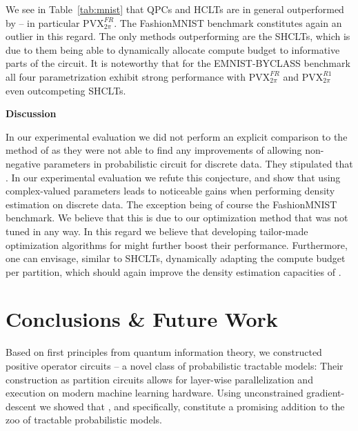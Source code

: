 We see in Table~\ref{tab:mnist} that QPCs and HCLTs are in general outperformed by \pvc -- in particular $\mathrm{PVX}_{2\pi}^{FR}$. The FashionMNIST benchmark constitutes again an outlier in this regard.
The only methods outperforming \pvcs are the SHCLTs, which is due to them being able to dynamically allocate compute budget to informative parts of the circuit.
It is noteworthy that for the EMNIST-BYCLASS benchmark all four  \pvc parametrization exhibit strong performance with  $\mathrm{PVX}_{2\pi}^{FR}$ and $\mathrm{PVX}_{2\pi}^{R1}$ even outcompeting SHCLTs.


\textbf{Discussion}

In our experimental evaluation we did not perform an explicit comparison to the method of \citet{loconte2024subtractive} as they were not able to find any improvements of allowing non-negative parameters in probabilistic circuit for discrete data. They stipulated that
.
In our experimental evaluation we refute this conjecture, and show that using complex-valued parameters leads to noticeable gains when performing density estimation on discrete data.
The exception being of course the FashionMNIST benchmark. We believe that this is due to our optimization method that was not tuned in any way.
In this regard we believe that developing tailor-made optimization algorithms for \pvcs might further boost their performance.
Furthermore, one can envisage, similar to SHCLTs, dynamically adapting the compute budget per partition, which should again improve the density estimation capacities of \pvcs.






\section{Conclusions \& Future Work}
\label{sec:conclusions}

Based on first principles from quantum information theory, we constructed positive operator circuits -- a novel class of probabilistic tractable models:
Their construction as partition circuits allows for layer-wise parallelization and execution on modern machine learning hardware.
Using unconstrained gradient-descent we showed that \pocs, and \pvcs specifically, constitute a promising addition to the zoo of tractable probabilistic models.

